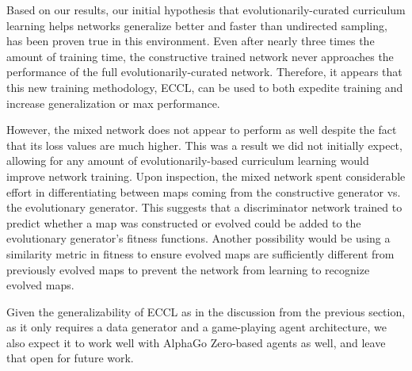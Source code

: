 \documentclass[letterpaper]{article} %
\begin{document}
Based on our results, our initial hypothesis that evolutionarily-curated curriculum learning helps networks generalize better and faster than undirected sampling, has been proven true in this environment. Even after nearly three times the amount of training time, the constructive trained network never approaches the performance of the full evolutionarily-curated network. Therefore, it appears that this new training methodology, ECCL, can be used to both expedite training and increase generalization or max performance.

However, the mixed network does not appear to perform as well despite the fact that its loss values are much higher. This was a result we did not initially expect, allowing for any amount of evolutionarily-based curriculum learning would improve network training. Upon inspection, the mixed network spent considerable effort in differentiating between maps coming from the constructive generator vs. the evolutionary generator. This suggests that a discriminator network trained to predict whether a map was constructed or evolved could be added to the evolutionary generator's fitness functions. Another possibility would be using a similarity metric in fitness to ensure evolved maps are sufficiently different from previously evolved maps to prevent the network from learning to recognize evolved maps.

Given the generalizability of ECCL as in the discussion from the previous section, as it only requires a data generator and a game-playing agent architecture, we also expect it to work well with AlphaGo Zero-based agents as well, and leave that open for future work.
\end{document}
